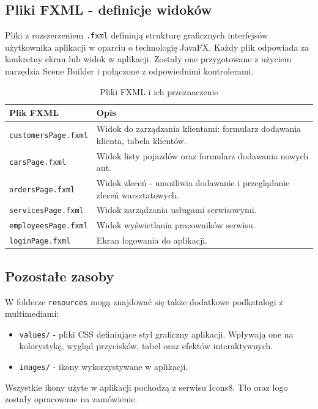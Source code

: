 \subsection{Pliki FXML - definicje widoków}

Pliki z rozszerzeniem \texttt{.fxml} definiują strukturę graficznych interfejsów użytkownika aplikacji w oparciu o technologię JavaFX. Każdy plik odpowiada za konkretny ekran lub widok w aplikacji. Zostały one przygotowane z użyciem narzędzia Scene Builder i połączone z odpowiednimi kontrolerami.

\begin{table}[H]
\centering
\begin{tabular}{|p{4.5cm}|p{9.5cm}|}
\hline
\textbf{Plik FXML} & \textbf{Opis} \\
\hline
\texttt{customersPage.fxml} & Widok do zarządzania klientami: formularz dodawania klienta, tabela klientów. \\
\texttt{carsPage.fxml} & Widok listy pojazdów oraz formularz dodawania nowych aut. \\
\texttt{ordersPage.fxml} & Widok zleceń - umożliwia dodawanie i przeglądanie zleceń warsztatowych. \\
\texttt{servicesPage.fxml} & Widok zarządzania usługami serwisowymi. \\
\texttt{employeesPage.fxml} & Widok wyświetlania pracowników serwisu. \\
\texttt{loginPage.fxml} & Ekran logowania do aplikacji. \\
\hline
\end{tabular}
\caption{Pliki FXML i ich przeznaczenie}
\end{table}

\subsection{Pozostałe zasoby}

W folderze \texttt{resources} mogą znajdować się także dodatkowe podkatalogi z multimediami:

\begin{itemize}
    \item \texttt{values/} - pliki CSS definiujące styl graficzny aplikacji. Wpływają one na kolorystykę, wygląd przycisków, tabel oraz efektów interaktywnych.
    \item \texttt{images/} - ikony wykorzystywane w aplikacji.
\end{itemize}
Wszystkie ikony użyte w aplikacji pochodzą z serwisu Icons8. Tło oraz logo zostały opracowane na zamówienie.

